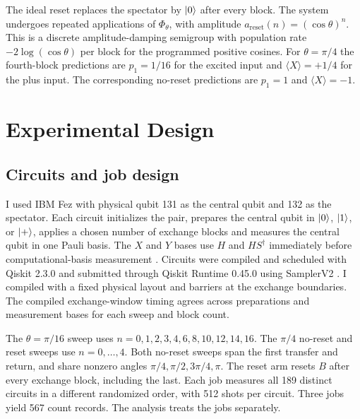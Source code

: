 \documentclass[
    pra,
    showpacs,
    groupedaddress,
    notitlepage,
    floatfix,
    nofootinbib
]{revtex4-2}
\begin{document}
The ideal reset replaces the spectator by $\ket0$ after every block. The system undergoes repeated applications of $\Phi_\theta$, 
with amplitude $a_{\mathrm{reset}}(n)=(\cos\theta)^n$. This is a discrete amplitude-damping semigroup with population rate $-2\log(\cos\theta)$ 
per block for the programmed positive cosines. For $\theta=\pi/4$ the fourth-block predictions are $p_1=1/16$ for the excited input and 
$\langle X\rangle=+1/4$ for the plus input. The corresponding no-reset predictions are $p_1=1$ and $\langle X\rangle=-1$.

\section{Experimental Design}
\subsection{Circuits and job design}
I used IBM Fez with physical qubit 131 as the central qubit and 132 as the spectator. Each circuit initializes the pair, prepares the central 
qubit in $\ket0$, $\ket1$, or $\ket+$, applies a chosen number of exchange blocks and measures the central qubit in one Pauli basis. The $X$ and $Y$ 
bases use $H$ and $HS^\dagger$ immediately before computational-basis measurement \cite{tomography}. Circuits were compiled and scheduled with Qiskit 2.3.0 and
submitted through Qiskit Runtime 0.45.0 using SamplerV2 \cite{ibmsampler}. I compiled with a fixed physical layout and barriers at the
exchange boundaries. The compiled exchange-window timing agrees across preparations and measurement bases for each sweep and block count.

The $\theta=\pi/16$ sweep uses $n=0,1,2,3,4,6,8,10,12,14,16$. The $\pi/4$ no-reset and reset sweeps use $n=0,\ldots,4$. Both no-reset sweeps span the 
first transfer and return, and share nonzero angles $\pi/4,\pi/2,3\pi/4,\pi$. The reset arm resets $B$ after every exchange block, including the last. 
Each job measures all 189 distinct circuits in a different randomized order, with 512 shots per circuit. Three jobs yield 567 count records. 
The analysis treats the jobs separately.
\end{document}
